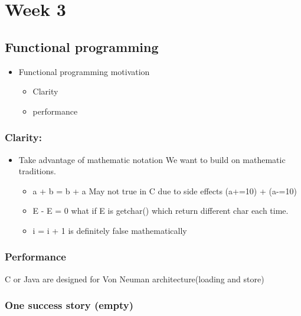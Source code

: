 \documentclass[11pt]{article}
\begin{document}
\section{Week 3}
\label{sec:org42e3059}
\subsection{Functional programming}
\label{sec:org65cdde2}
\begin{itemize}
\item Functional programming motivation
\begin{itemize}
\item Clarity
\item performance
\end{itemize}
\end{itemize}

\subsubsection{Clarity:}
\label{sec:orgd5c2ac2}
\begin{itemize}
\item Take advantage of mathematic notation
We want to build on mathematic traditions.
\begin{itemize}
\item a + b = b + a
May not true in C due to side effects
(a+=10) + (a-=10)
\item E - E = 0
what if E is getchar() which return different char each time.
\item i = i + 1 is definitely false mathematically
\end{itemize}
\end{itemize}

\subsubsection{Performance}
\label{sec:org18fa146}
C or Java are designed for Von Neuman architecture(loading and store)

\subsubsection{One success story (empty)}
\label{sec:org6484c3a}
\end{document}
